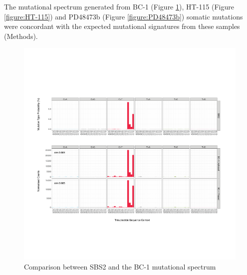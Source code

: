 The mutational spectrum generated from BC-1 (Figure \ref{figure:BC-1}), HT-115 (Figure \ref{figure:HT-115}) and PD48473b (Figure \ref{figure:PD48473b}) somatic mutations were concordant with the expected mutational signatures from these samples (Methods). 

\begin{figure}[htbp!]
\caption{Comparison between SBS2 and the BC-1 mutational spectrum}
\label{figure:BC-1}
\includegraphics[width=\textwidth]{Vector/hg19.SBS2.BC-1.pdf}
\end{figure}


